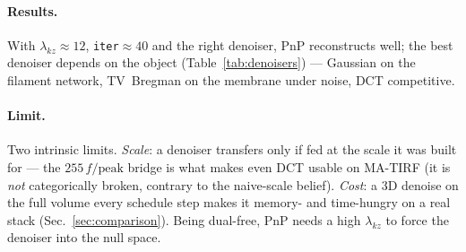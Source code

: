 \paragraph{Results.}
With $\lambda_{kz}\approx12$, \texttt{iter}${\approx}40$ and the right denoiser, PnP reconstructs
well; the best denoiser depends on the object (Table~\ref{tab:denoisers}) --- Gaussian on the
filament network, TV~Bregman on the membrane under noise, DCT competitive.

\paragraph{Limit.}
Two intrinsic limits. \emph{Scale}: a denoiser transfers only if fed at the scale it was built for
--- the $255\,f/\text{peak}$ bridge is what makes even DCT usable on MA-TIRF (it is \emph{not}
categorically broken, contrary to the naive-scale belief). \emph{Cost}: a 3D denoise on the full
volume every schedule step makes it memory- and time-hungry on a real stack (Sec.~\ref{sec:comparison}).
Being dual-free, PnP needs a high $\lambda_{kz}$ to force the denoiser into the null space.
